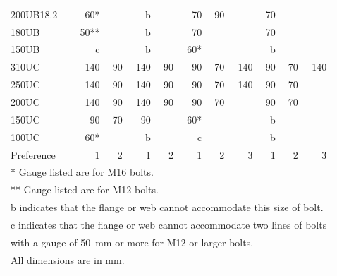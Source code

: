 \begin{table}[H]
\begin{minipage}{.8\linewidth}
\begin{tabular}{l|rr|rr|rrr|rrr}
	200UB18.2                   &  60* &                   &   b &                    &  70 & 90 &               &  70 &    &              \\
	180UB                       & 50** &                   &   b &                    &  70 &    &               &  70 &    &              \\
	150UB                       &    c &                   &   b &                    &  60* &    &               &   b &    &              \\
	310UC                       &  140 &                90 & 140 &                 90 &  90 & 70 &           140 &  90 & 70 &          140 \\
	250UC                       &  140 &                90 & 140 &                 90 &  90 & 70 &           140 &  90 & 70 &              \\
	200UC                       &  140 &                90 & 140 &                 90 &  90 & 70 &               &  90 & 70 &              \\
	150UC                       &   90 &                70 &  90 &                    &  60* &    &               &   b &    &              \\
	100UC                       &  60* &                   &   b &                    &   c &    &               &   b &    &              \\
	Preference                  &    1 &                 2 &   1 &                  2 &   1 &  2 &             3 &   1 &  2 &            3 \\ \bottomrule
\multicolumn{11}{l}{* Gauge listed are for M16 bolts.}\\
\multicolumn{11}{l}{** Gauge listed are for M12 bolts.}\\
\multicolumn{11}{l}{b indicates that the flange or web cannot accommodate this size of bolt.}\\
\multicolumn{11}{l}{c indicates that the flange or web cannot accommodate two lines of bolts}\\
\multicolumn{11}{l}{with a gauge of \SI{50}{\mm} or more for M12 or larger bolts.}\\
\multicolumn{11}{l}{All dimensions are in \si{\mm}.}
\end{tabular}
\end{minipage}
\begin{minipage}{.19\linewidth}\centering

\end{minipage}
\end{table}
